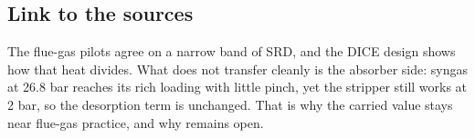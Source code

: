 \subsection*{Link to the sources}
The flue-gas pilots agree on a narrow band of SRD, and the DICE design shows how that heat divides. What does not transfer cleanly is the absorber side: syngas at 26.8 bar reaches its rich loading with little pinch, yet the stripper still works at 2 bar, so the desorption term is unchanged. That is why the carried value stays near flue-gas practice, and why  remains open.

